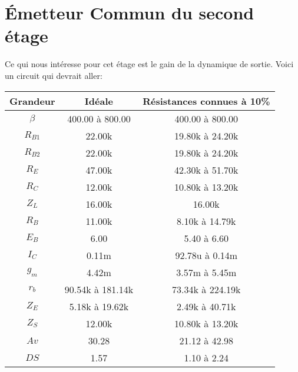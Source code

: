   \section{Émetteur Commun du second étage}

  Ce qui nous intéresse pour cet étage est le gain de la dynamique de sortie.
  Voici un circuit qui devrait aller:
   \begin{tabular}{|c|c|c|}
    \hline
 Grandeur  & Idéale    &  Résistances connues à 10\% \\\hline
 $\beta$   &         400.00 à 800.00 &  400.00 à 800.00 \\\hline
 $R_{B1}$  &          22.00k     &   19.80k à 24.20k \\\hline
 $R_{B2}$  &          22.00k     &   19.80k à 24.20k \\\hline
 $R_E$  &          47.00k     &   42.30k à 51.70k \\\hline
 $R_C$  &          12.00k     &   10.80k à 13.20k \\\hline
 $Z_L$  &          16.00k     &        16.00k      \\\hline
 $R_B$  &          11.00k     &   8.10k à 14.79k  \\\hline
 $E_B$  &           6.00      &     5.40 à 6.60   \\\hline
 $I_C$  &          0.11m      &   92.78u à 0.14m  \\\hline
 $g_m$  &          4.42m      &    3.57m à 5.45m  \\\hline
 $r_b$  &    90.54k à 181.14k & 73.34k à 224.19k \\\hline
 $Z_E$  &     5.18k à 19.62k  &  2.49k à 40.71k  \\\hline
 $Z_S$  &          12.00k     &   10.80k à 13.20k \\\hline
 $Av$   &          30.28      &    21.12 à 42.98  \\\hline
 $DS$   &           1.57      &     1.10 à 2.24   \\\hline
\end{tabular}
